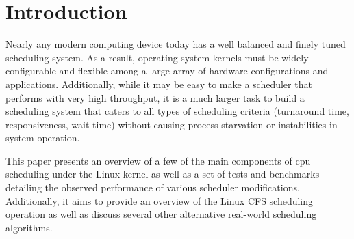 \section{Introduction}
	Nearly any modern computing device today has a well balanced and finely tuned scheduling system. As a result, operating system kernels must be widely configurable and flexible among a large array of hardware configurations and applications. Additionally, while it may be easy to make a scheduler that performs with very high throughput, it is a much larger task to build a scheduling system that caters to all types of scheduling criteria (turnaround time, responsiveness, wait time) without causing process starvation or instabilities in system operation.
	
	This paper presents an overview of a few of the main components of cpu scheduling under the Linux kernel as well as a set of tests and benchmarks detailing the observed performance of various scheduler modifications. Additionally, it aims to provide an overview of the Linux CFS scheduling operation as well as discuss several other alternative real-world scheduling algorithms.